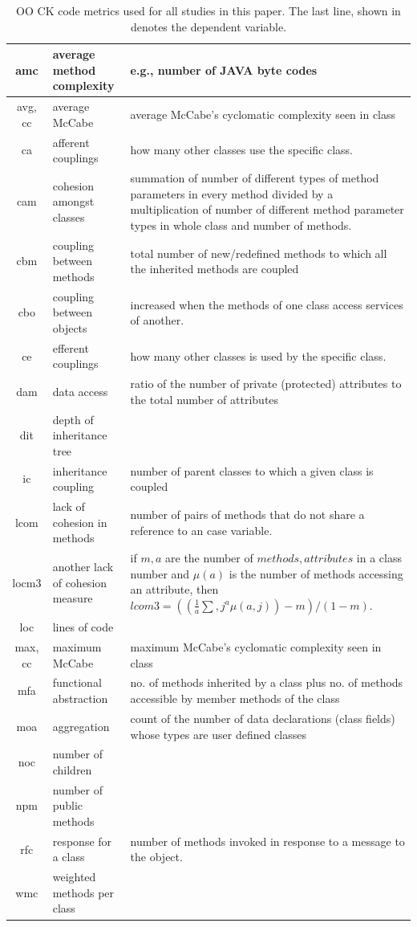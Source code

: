 \documentclass[sigconf,review, anonymous]{acmart}
\theoremstyle{break}
\theoremstyle{break}
\begin{document}
 \begin{table}[!t]
\renewcommand{\baselinestretch}{0.8}\begin{center}
\caption{OO CK code metrics used for all studies in this paper.
The last line, shown in denotes the dependent variable.}
\label{fig:ck}
{\footnotesize
\begin{tabular}{c|l|p{4.4in}}
amc & average method complexity & e.g., number of JAVA byte codes\\
\hline
avg, cc & average McCabe & average McCabe's cyclomatic complexity seen
in class\\
\hline
ca & afferent couplings & how many other classes use the specific
class. \\
\hline
cam & cohesion amongst classes & summation of number of different
types of method parameters in every method divided by a multiplication
of number of different method parameter types in whole class and
number of methods. \\
\hline
cbm &coupling between methods & total number of new/redefined methods
to which all the inherited methods are coupled\\
\hline
cbo & coupling between objects & increased when the methods of one
class access services of another.\\
\hline
ce & efferent couplings & how many other classes is used by the
specific class. \\
\hline
dam & data access & ratio of the number of private (protected)
attributes to the total number of attributes\\
\hline
dit & depth of inheritance tree &\\
\hline
ic & inheritance coupling & number of parent classes to which a given
class is coupled
\\
\hline
lcom & lack of cohesion in methods &number of pairs of methods that do
not share a reference to an case variable.\\
\hline
locm3 & another lack of cohesion measure & if $m,a$ are the number of
$methods,attributes$
in a class number and $\mu(a)$ is the number of methods accessing an
attribute,
then
$lcom3=((\frac{1}{a} \sum, j^a \mu(a, j)) - m)/ (1-m)$.
\\
\hline
loc & lines of code &\\
\hline
max, cc & maximum McCabe & maximum McCabe's cyclomatic complexity seen
in class\\
\hline
mfa & functional abstraction & no. of methods inherited by a class
plus no. of methods accessible by member methods of the
class\\
\hline
moa & aggregation & count of the number of data declarations (class
fields) whose types are user defined classes\\
\hline
noc & number of children &\\
\hline
npm & number of public methods & \\
\hline
rfc & response for a class &number of methods invoked in response to
a message to the object.\\
\hline
wmc & weighted methods per class &\\
\hline
 

\end{tabular}}
\end{center}
\end{table}
\end{document}
